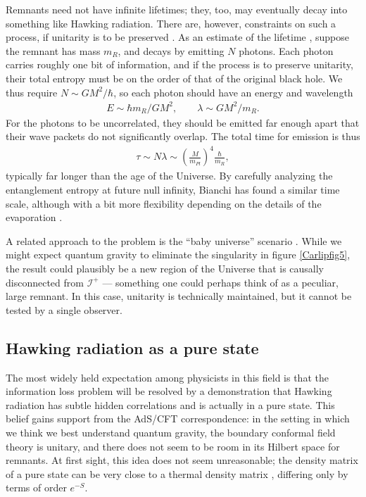 \documentclass[12pt]{article}
\begin{document}
Remnants need not have infinite lifetimes; they, too, may
eventually decay into something like Hawking radiation.  There
are, however,  constraints on such a process, if
unitarity is to be preserved \cite{Aharanov,Carlitz}.  As an
estimate of the lifetime \cite{Giddingsy}, suppose the remnant 
has mass $m_R$, and decays by emitting $N$ photons.  Each 
photon carries roughly one bit of information, and if the
process is to preserve unitarity, their total entropy must be
on the order of that of the original black hole.  We
thus require $N\sim GM^2/\hbar$, so each photon should have
an energy and wavelength
\begin{align*}
E \sim \hbar m_R/GM^2, \qquad \lambda \sim GM^2/m_R  .
\end{align*}
For the photons to be uncorrelated, they should be emitted far enough
apart that their wave packets do not significantly overlap.  The total 
time for emission is thus
\begin{align}
\tau \sim N\lambda \sim \left(\frac{M}{m_{Pl}}\right)^4\frac{\hbar}{m_R}  ,
\label{Carlipj2}
\end{align}
typically far longer than the age of the Universe.
By carefully analyzing the entanglement entropy at future null
infinity, Bianchi has found a similar time scale, although with a
bit more flexibility depending on the details of the evaporation
\cite{Bianchix}.

A related approach to the problem is the ``baby 
universe'' scenario \cite{Hawking_baby}.  While we might expect
quantum gravity to eliminate the singularity in figure \ref{Carlipfig5},
the result could plausibly be a new region of the Universe
that is causally disconnected from $\mathcal{I}^+$ --- something
one could perhaps think of as a peculiar, large remnant.  In this case,
unitarity is technically maintained, but it cannot be tested by a single
observer.   

\subsection{Hawking radiation as a pure state}

The most widely held expectation among physicists in this
field is that the information loss problem will be resolved by a
demonstration that Hawking radiation has subtle hidden correlations 
and is actually in a pure state.  This belief gains support from the
AdS/CFT correspondence: in the setting in which we think we best
understand quantum gravity, the boundary conformal field theory
is unitary, and there does not seem to be room in its Hilbert space
for remnants.  At first sight, this idea does not seem unreasonable; 
the density matrix of a pure state can be very close to a thermal 
density matrix \cite{Papadodimas}, differing only by terms of
order $e^{-S}$.  
\end{document}

